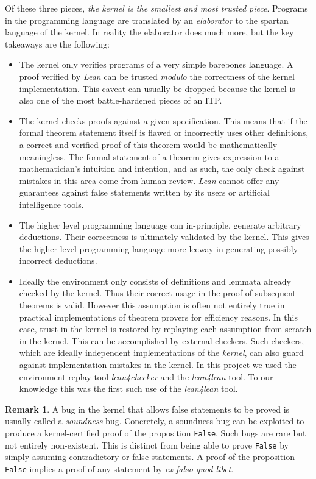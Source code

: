 \documentclass[12pt]{amsart}
\theoremstyle{definition}
\newtheorem{remark}[theorem]{Remark}
\begin{document}
Of these three pieces, \emph{the kernel is the smallest and most trusted piece}. Programs in the programming language are translated by an \emph{elaborator} to the spartan language of the kernel. In reality the elaborator does much more, but the key takeaways are the following:
\begin{itemize}
    \item The kernel only verifies programs of a very simple barebones language. A proof verified by \emph{Lean} can be trusted \emph{modulo} the correctness of the kernel implementation. This caveat can usually be dropped because the kernel is also one of the most battle-hardened pieces of an ITP.
    \item The kernel checks proofs against a given specification. This means that if the formal theorem statement itself is flawed or incorrectly uses other definitions, a correct and verified proof of this theorem would be mathematically meaningless. The formal statement of a theorem gives expression to a mathematician's intuition and intention, and as such, the only check against mistakes in this area come from human review. \emph{Lean} cannot offer any guarantees against false statements written by its users or artificial intelligence tools.
    \item The higher level programming language can in-principle, generate arbitrary deductions. Their correctness is ultimately validated by the kernel. This gives the higher level programming language more leeway in generating possibly incorrect deductions.
    \item Ideally the environment only consists of definitions and lemmata already checked by the kernel. Thus their correct usage in the proof of subsequent theorems is valid. However this assumption is often not entirely true in practical implementations of theorem provers for efficiency reasons. In this case, trust in the kernel is restored by replaying each assumption from scratch in the kernel. This can be accomplished by external checkers. Such checkers, which are ideally independent implementations of the \emph{kernel}, can also guard against implementation mistakes in the kernel. In this project we used the environment replay tool \textit{lean4checker} and the \textit{lean4lean} \cite{lean4lean} tool. To our knowledge this was the first such use of the \textit{lean4lean} tool.

\end{itemize}

\begin{remark}
    A bug in the kernel that allows false statements to be proved is usually called a \emph{soundness} bug. Concretely, a soundness bug can be exploited to produce a kernel-certified proof of the proposition \texttt{False}. Such bugs are rare but not entirely non-existent. This is distinct from being able to prove \texttt{False} by simply assuming contradictory or false statements. A proof of the proposition \texttt{False} implies a proof of any statement by \emph{ex falso quod libet}.
\end{remark}
\end{document}
